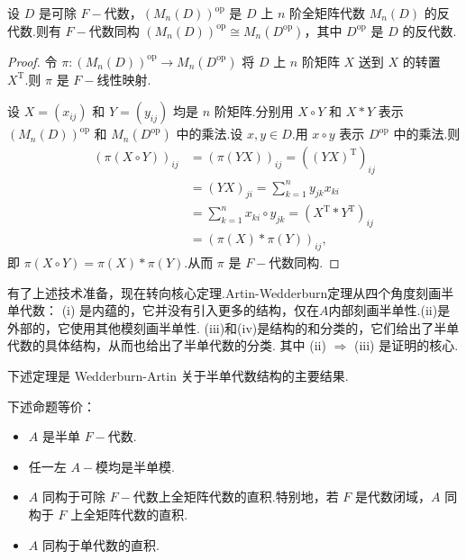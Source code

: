 \begin{lemma}
设 $D$ 是可除 $F-\!\!$代数，$(M_n(D))^{\mathrm{op}}$ 是 $D$ 上 $n$ 阶全矩阵代数 $M_n(D)$ 的反代数.则有 $F-\!\!$代数同构 $(M_n(D))^{\mathrm{op}} \cong M_n(D^{\mathrm{op}})$，其中 $D^{\mathrm{op}}$ 是 $D$ 的反代数.
\end{lemma}
\begin{proof}
令 $\pi : (M_n(D))^{\mathrm{op}} \to M_n(D^{\mathrm{op}})$ 将 $D$ 上 $n$ 阶矩阵 $X$ 送到 $X$ 的转置 $X^{\mathrm{T}}$.则 $\pi$ 是 $F-\!\!$线性映射.\par
设 $X=(x_{ij})$ 和 $Y=(y_{ij})$ 均是 $n$ 阶矩阵.分别用 $X \circ Y$ 和 $X * Y$ 表示 $(M_n(D))^{\mathrm{op}}$ 和 $M_n(D^{\mathrm{op}})$ 中的乘法.设 $x, y \in D$.用 $x \circ y$ 表示 $D^{\mathrm{op}}$ 中的乘法.则
\begin{align*}
    (\pi(X \circ Y))_{ij} &= (\pi(YX))_{ij} = ((YX)^{\mathrm{T}})_{ij} \\[-2pt]
&= (YX)_{ji} = \sum_{k=1}^n y_{jk} x_{ki} \\[-2pt]
&= \sum_{k=1}^n x_{ki} \circ y_{jk} = (X^{\mathrm{T}} * Y^{\mathrm{T}})_{ij} \\[-2pt]
&= (\pi(X) * \pi(Y))_{ij},
\end{align*}
即 $\pi(X \circ Y) = \pi(X) * \pi(Y)$.从而 $\pi$ 是 $F-\!\!$代数同构.
\end{proof}

有了上述技术准备，现在转向核心定理.Artin-Wedderburn定理从四个角度刻画半单代数：
(i) 是内蕴的，它并没有引入更多的结构，仅在$A$内部刻画半单性.(ii)是外部的，它使用其他模刻画半单性.
(iii)和(iv)是结构的和分类的，它们给出了半单代数的具体结构，从而也给出了半单代数的分类.
其中 (ii) $\Rightarrow$ (iii) 是证明的核心.

下述定理是 Wedderburn-Artin 关于半单代数结构的主要结果.

\begin{theorem}
下述命题等价：
\begin{itemize}
    \item[(i)] $A$ 是半单 $F-\!\!$代数.
    \item[(ii)] 任一左 $A-\!\!$模均是半单模.
    \item[(iii)] $A$ 同构于可除 $F-\!\!$代数上全矩阵代数的直积.特别地，若 $F$ 是代数闭域，$A$ 同构于 $F$ 上全矩阵代数的直积.
    \item[(iv)] $A$ 同构于单代数的直积.
\end{itemize}
\end{theorem}

